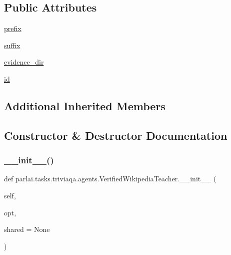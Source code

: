 \subsection*{Public Attributes}
\begin{DoxyCompactItemize}
\item 
\hyperlink{classparlai_1_1tasks_1_1triviaqa_1_1agents_1_1VerifiedWikipediaTeacher_a876c461eb0192fb040c30f4a2487c488}{prefix}
\item 
\hyperlink{classparlai_1_1tasks_1_1triviaqa_1_1agents_1_1VerifiedWikipediaTeacher_acc499929543ea473b7b298e28e22acab}{suffix}
\item 
\hyperlink{classparlai_1_1tasks_1_1triviaqa_1_1agents_1_1VerifiedWikipediaTeacher_a214e3d671d59a23a43315ccd367d8702}{evidence\+\_\+dir}
\item 
\hyperlink{classparlai_1_1tasks_1_1triviaqa_1_1agents_1_1VerifiedWikipediaTeacher_a37b2fd9a409408905a62cec4436774f2}{id}
\end{DoxyCompactItemize}
\subsection*{Additional Inherited Members}


\subsection{Constructor \& Destructor Documentation}
\mbox{\label{classparlai_1_1tasks_1_1triviaqa_1_1agents_1_1VerifiedWikipediaTeacher_a6af307d6cf32536d5a860a0481bea4a5}} 
\subsubsection{\texorpdfstring{\+\_\+\+\_\+init\+\_\+\+\_\+()}{\_\_init\_\_()}}
{\footnotesize\ttfamily def parlai.\+tasks.\+triviaqa.\+agents.\+Verified\+Wikipedia\+Teacher.\+\_\+\+\_\+init\+\_\+\+\_\+ (\begin{DoxyParamCaption}\item[{}]{self,  }\item[{}]{opt,  }\item[{}]{shared = {\ttfamily None} }\end{DoxyParamCaption})}



